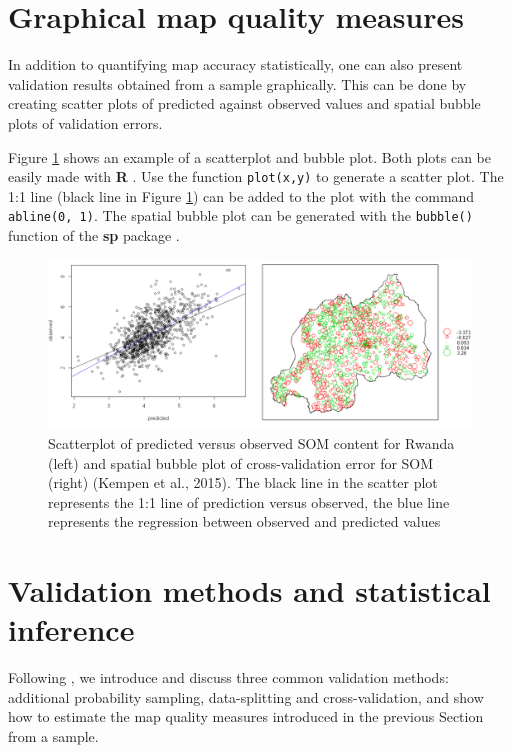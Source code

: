 \documentclass[10pt,b5paper,]{book}
\theoremstyle{definition}
\theoremstyle{definition}
\theoremstyle{definition}
\theoremstyle{remark}
\begin{document}
\hypertarget{graphical-map-quality-measures}{%
\section{Graphical map quality
measures}\label{graphical-map-quality-measures}}

In addition to quantifying map accuracy statistically, one can also
present validation results obtained from a sample graphically. This can
be done by creating scatter plots of predicted against observed values
and spatial bubble plots of validation errors.

Figure \ref{fig:rwandaval} shows an example of a scatterplot and bubble
plot. Both plots can be easily made with \textbf{R} \citep{rcore}. Use
the function \texttt{plot(x,y)} to generate a scatter plot. The 1:1 line
(black line in Figure \ref{fig:rwandaval}) can be added to the plot with
the command \texttt{abline(0,\ 1)}. The spatial bubble plot can be
generated with the \texttt{bubble()} function of the \textbf{sp} package
\citep{pebesma2005classes}.

\begin{figure}
\includegraphics[width=0.8\linewidth]{images/Validation_Rwanda} \caption{Scatterplot of predicted versus observed SOM content for Rwanda (left) and spatial bubble plot of cross-validation error for SOM (right) (Kempen et al., 2015). The black line in the scatter plot represents the 1:1 line of prediction versus observed, the blue line represents the regression between observed and predicted values}\label{fig:rwandaval}
\end{figure}

\hypertarget{validationMeth}{%
\section{Validation methods and statistical
inference}\label{validationMeth}}

Following \citet{brus2011sampling}, we introduce and discuss three
common validation methods: additional probability sampling,
data-splitting and cross-validation, and show how to estimate the map
quality measures introduced in the previous Section from a sample.
\end{document}
